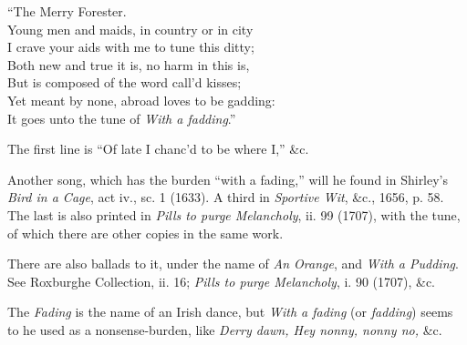\begin{scverse}\vin\vin\vin\vin “The Merry Forester.\\
Young men and maids, in country or in city\\
I crave your aids with me to tune this ditty;\\
Both new and true it is, no harm in this is,\\
But is composed of the word call’d kisses;\\
Yet meant by none, abroad loves to be gadding:\\
It goes unto the tune of \textit{With a fadding}.”
\end{scverse}
The first line is “Of late I chanc’d to be where I,” \&c.

Another song, which has the burden “with a fading,” will he found in
Shirley’s \textit{Bird in a Cage}, act iv., sc. 1 (1633). A third in \textit{Sportive Wit}, \&c.,
1656, p. 58. The last is also printed in \textit{Pills to purge Melancholy}, ii. 99 (1707),
with the tune, of which there are other copies in the same work.

There are also ballads to it, under the name of \textit{An Orange}, and \textit{With a
Pudding}. See Roxburghe Collection, ii. 16; \textit{Pills to purge Melancholy}, i. 90
(1707), \&c.

The \textit{Fading} is the name of an Irish dance, but\textit{ With a fading} (or \textit{fadding})
seems to he used as a nonsense-burden, like \textit{Derry dawn, Hey nonny, nonny no,} \&c.



\pagebreak

